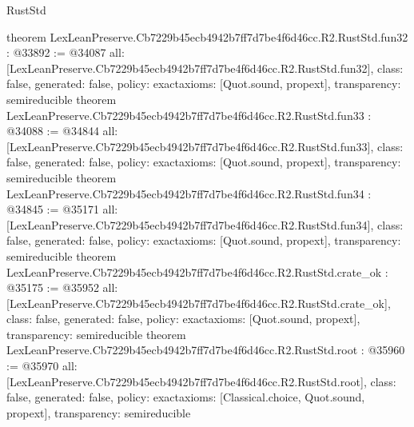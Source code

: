 \begin{lexlean}{RustStd}
\begin{coremodule}
{}
theorem LexLeanPreserve.Cb7229b45ecb4942b7ff7d7be4f6d46cc.R2.RustStd.fun32 : @33892 := @34087 {
  all: [LexLeanPreserve.Cb7229b45ecb4942b7ff7d7be4f6d46cc.R2.RustStd.fun32],
  class: false,
  generated: false,
  policy: exact{axioms: [Quot.sound, propext]},
  transparency: semireducible
}
theorem LexLeanPreserve.Cb7229b45ecb4942b7ff7d7be4f6d46cc.R2.RustStd.fun33 : @34088 := @34844 {
  all: [LexLeanPreserve.Cb7229b45ecb4942b7ff7d7be4f6d46cc.R2.RustStd.fun33],
  class: false,
  generated: false,
  policy: exact{axioms: [Quot.sound, propext]},
  transparency: semireducible
}
theorem LexLeanPreserve.Cb7229b45ecb4942b7ff7d7be4f6d46cc.R2.RustStd.fun34 : @34845 := @35171 {
  all: [LexLeanPreserve.Cb7229b45ecb4942b7ff7d7be4f6d46cc.R2.RustStd.fun34],
  class: false,
  generated: false,
  policy: exact{axioms: [Quot.sound, propext]},
  transparency: semireducible
}
theorem LexLeanPreserve.Cb7229b45ecb4942b7ff7d7be4f6d46cc.R2.RustStd.crate_ok : @35175 := @35952 {
  all: [LexLeanPreserve.Cb7229b45ecb4942b7ff7d7be4f6d46cc.R2.RustStd.crate_ok],
  class: false,
  generated: false,
  policy: exact{axioms: [Quot.sound, propext]},
  transparency: semireducible
}
theorem LexLeanPreserve.Cb7229b45ecb4942b7ff7d7be4f6d46cc.R2.RustStd.root : @35960 := @35970 {
  all: [LexLeanPreserve.Cb7229b45ecb4942b7ff7d7be4f6d46cc.R2.RustStd.root],
  class: false,
  generated: false,
  policy: exact{axioms: [Classical.choice, Quot.sound, propext]},
  transparency: semireducible
}


\end{coremodule}
\end{lexlean}
